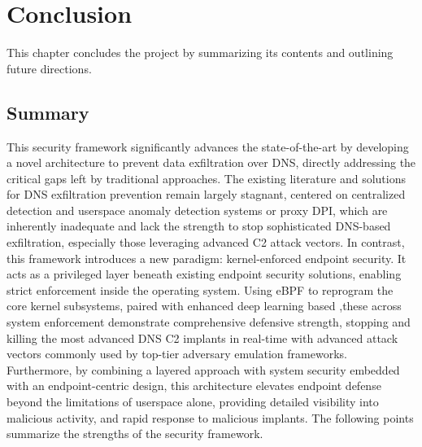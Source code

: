 \documentclass [11pt, proquest] {uwthesis}[2020/02/24]
\begin{document}


    

\chapter{Conclusion}
This chapter concludes the project by summarizing its contents and outlining future directions.

\section{Summary}
This security framework significantly advances the state-of-the-art by developing a novel architecture to prevent data exfiltration over DNS, directly addressing the critical gaps left by traditional approaches. The existing literature and solutions for DNS exfiltration prevention remain largely stagnant, centered on centralized detection and userspace anomaly detection systems or proxy DPI, which are inherently inadequate and lack the strength to stop sophisticated DNS-based exfiltration, especially those leveraging advanced C2 attack vectors. In contrast, this framework introduces a new paradigm: kernel-enforced endpoint security. It acts as a privileged layer beneath existing endpoint security solutions, enabling strict enforcement inside the operating system. Using eBPF to reprogram the core kernel subsystems, paired with enhanced deep learning based ,these across system enforcement demonstrate comprehensive defensive strength, stopping and killing the most advanced DNS C2 implants in real-time with advanced attack vectors commonly used by top-tier adversary emulation frameworks.
Furthermore, by combining a layered approach with system security embedded with an endpoint-centric design, this architecture elevates endpoint defense beyond the limitations of userspace alone, providing detailed visibility into malicious activity, and rapid response to malicious implants. The following points summarize the strengths of the security framework.
\end{document}
